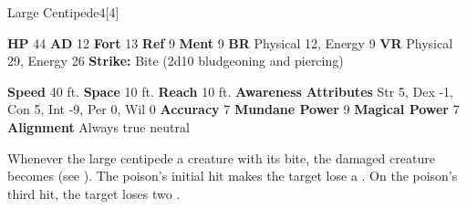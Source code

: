       
  \begin{monsubsection}{Large Centipede}{4}[4]
    \vspace{-1em}\vspace{-1em}
    \vspace{0em}

    
    

    \begin{spellcontent}
      \begin{spelltargetinginfo}
        \pari \textbf{HP} 44 \monsep
          \textbf{AD} 12 \monsep
          \textbf{Fort} 13 \monsep
          \textbf{Ref} 9 \monsep
          \textbf{Ment} 9
        \pari \textbf{BR} Physical 12, Energy 9 \monsep
        \textbf{VR} Physical 29, Energy 26
        \pari \textbf{Strike:}
            Bite  (2d10 bludgeoning and piercing)
      \end{spelltargetinginfo}
    \end{spellcontent}
    \begin{monsterfooter}
      \pari \textbf{Speed} 40 ft. \monsep
        \textbf{Space} 10 ft. \monsep
        \textbf{Reach} 10 ft.
      \pari \textbf{Awareness} 
      \pari \textbf{Attributes}
        Str 5, Dex -1,
        Con 5, Int -9,
        Per 0, Wil 0
      \pari \textbf{Accuracy} 7 \monsep
        \textbf{Mundane Power} 9 \monsep
      \textbf{Magical Power} 7
      \pari \textbf{Alignment} Always true neutral
    \end{monsterfooter}
  \end{monsubsection}
        Whenever the large centipede  a creature with its bite,
          the damaged creature becomes  (see ).
        The poison's initial hit makes the target lose a .
        On the poison's third hit, the target loses two .
  


